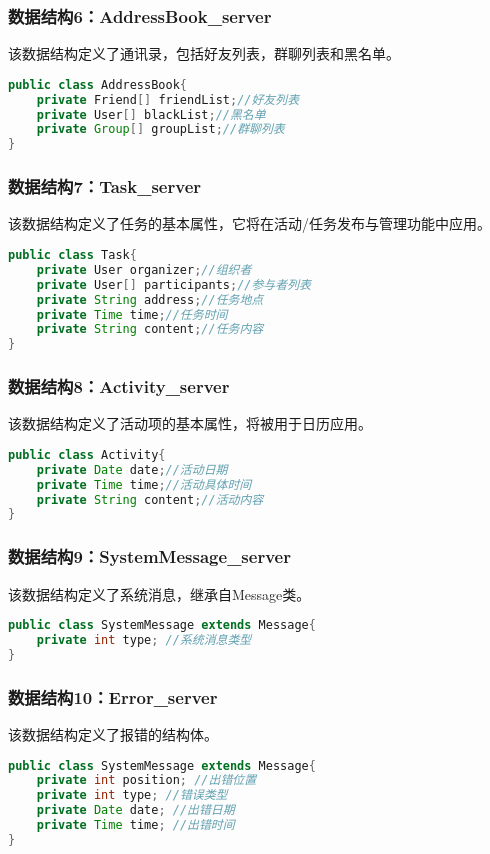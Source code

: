 \subsubsection{\color{red} 数据结构6：AddressBook\_server}
该数据结构定义了通讯录，包括好友列表，群聊列表和黑名单。
\begin{lstlisting}[language=Java, caption=AddressBook定义]
public class AddressBook{
    private Friend[] friendList;//好友列表
    private User[] blackList;//黑名单
    private Group[] groupList;//群聊列表
}
\end{lstlisting}

\subsubsection{\color{red} 数据结构7：Task\_server}
该数据结构定义了任务的基本属性，它将在活动/任务发布与管理功能中应用。
\begin{lstlisting}[language=Java, caption=Task定义]
public class Task{
    private User organizer;//组织者
    private User[] participants;//参与者列表
    private String address;//任务地点
    private Time time;//任务时间
    private String content;//任务内容
}
\end{lstlisting}

\subsubsection{\color{red} 数据结构8：Activity\_server}
该数据结构定义了活动项的基本属性，将被用于日历应用。
\begin{lstlisting}[language=Java, caption=Activity定义]
public class Activity{
    private Date date;//活动日期
    private Time time;//活动具体时间
    private String content;//活动内容
}
\end{lstlisting}

\subsubsection{\color{red} 数据结构9：SystemMessage\_server}
该数据结构定义了系统消息，继承自Message类。
\begin{lstlisting}[language=Java, caption=SystemMessage定义]
public class SystemMessage extends Message{
    private int type; //系统消息类型
}
\end{lstlisting}

\subsubsection{\color{red} 数据结构10：Error\_server}
该数据结构定义了报错的结构体。
\begin{lstlisting}[language=Java, caption=Error定义]
public class SystemMessage extends Message{
    private int position; //出错位置
    private int type; //错误类型
    private Date date; //出错日期
    private Time time; //出错时间
}
\end{lstlisting}


